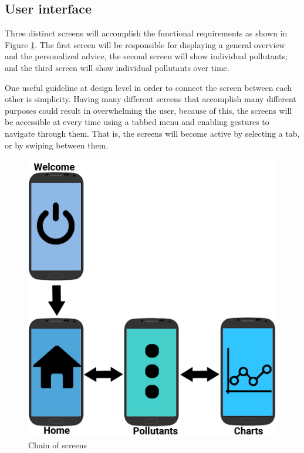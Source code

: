 \subsection{User interface}
Three distinct screens will accomplish the functional requirements as shown in Figure \ref{fig:chain_of_screens}. The first screen will be responsible for displaying a general overview and the personalized advice, the second screen will show individual pollutants; and the third screen will show individual pollutants over time. 

One useful guideline at design level in order to connect the screen between each other is simplicity. Having many different screens that accomplish many different purposes could result in overwhelming the user, because of this, the screens will be accessible at every time using a tabbed menu and enabling gestures to navigate through them. That is, the screens will become active by selecting a tab, or by swiping between them.

\begin{figure}[H]
\begin{adjustbox}{width=.45\textwidth,center=\textwidth}
  \centering
  \includegraphics[scale=1]{images/screenChain.png}
\end{adjustbox}
  \caption[Chain of screens]{Chain of screens}
  \label{fig:chain_of_screens}
\end{figure}

